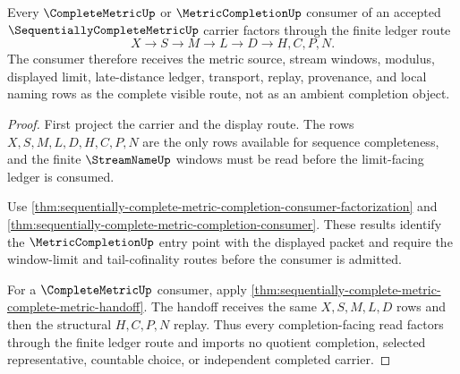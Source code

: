 \begin{theorem}
\label{thm:sequentially-complete-metric-completion-factorization-ledger}
Every $\CompleteMetricUp$ or $\MetricCompletionUp$ consumer of an accepted $\SequentiallyCompleteMetricUp$ carrier factors through the finite ledger route
$$
X \to S \to M \to L \to D \to H,C,P,N .
$$
The consumer therefore receives the metric source, stream windows, modulus, displayed limit, late-distance ledger, transport, replay, provenance, and local naming rows as the complete visible route, not as an ambient completion object.
\end{theorem}
\begin{proof}
First project the carrier and the display route. The rows $X,S,M,L,D,H,C,P,N$ are the only rows available for sequence completeness, and the finite $\StreamNameUp$ windows must be read before the limit-facing ledger is consumed.

Use \autoref{thm:sequentially-complete-metric-completion-consumer-factorization} and \autoref{thm:sequentially-complete-metric-completion-consumer}. These results identify the $\MetricCompletionUp$ entry point with the displayed packet and require the window-limit and tail-cofinality routes before the consumer is admitted.

For a $\CompleteMetricUp$ consumer, apply \autoref{thm:sequentially-complete-metric-complete-metric-handoff}. The handoff receives the same $X,S,M,L,D$ rows and then the structural $H,C,P,N$ replay. Thus every completion-facing read factors through the finite ledger route and imports no quotient completion, selected representative, countable choice, or independent completed carrier.
\end{proof}
